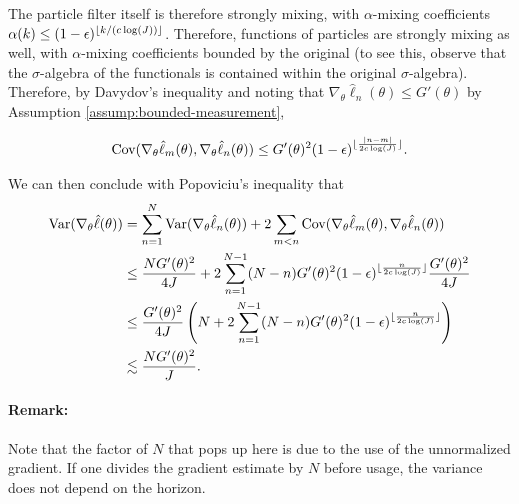 \documentclass{article}
\begin{document}
The particle filter itself is therefore strongly mixing, with $\alpha$-mixing coefficients $\alpha(k) \leq (1-\epsilon)^{\lfloor k/(c\log(J)) \rfloor}$. Therefore, functions of particles are strongly mixing as well, with $\alpha$-mixing coefficients bounded by the original (to see this, observe that the $\sigma$-algebra of the functionals is contained within the original $\sigma$-algebra). Therefore, by Davydov's inequality and noting that $\nabla_\theta\hat\ell_n(\theta)\leq G'(\theta)$ by Assumption \ref{assump:bounded-measurement}, 

$$\text{Cov}(\nabla_\theta\hat\ell_m(\theta), \nabla_\theta\hat\ell_n(\theta)) \leq G'(\theta)^2(1-\epsilon)^{\lfloor \frac{|n-m|}{2c\log(J)} \rfloor}.$$

We can then conclude with Popoviciu's inequality that 
\begin{align*}
    \text{Var}(\nabla_\theta \hat\ell(\theta)) &= \sum_{n=1}^N \text{Var}(\nabla_\theta\hat\ell_n(\theta)) + 2\sum_{m<n} \text{Cov}(\nabla_\theta\hat\ell_m(\theta),\nabla_\theta\hat\ell_n(\theta))\\
    &\leq \frac{NG'(\theta)^2}{4J} + 2\sum_{n=1}^{N-1} (N-n) G'(\theta)^2(1-\epsilon)^{\lfloor \frac{n}{2c\log(J)} \rfloor}\frac{G'(\theta)^2}{4J} \\
    &\leq \frac{G'(\theta)^2}{4J} \left(N + 2\sum_{n=1}^{N-1} (N-n) G'(\theta)^2(1-\epsilon)^{\lfloor \frac{n}{2c\log(J)} \rfloor}\right) \\
    &\lesssim \frac{NG'(\theta)^2}{J}.
\end{align*}

\paragraph{Remark:} Note that the factor of $N$ that pops up here is due to the use of the unnormalized gradient. If one divides the gradient estimate by $N$ before usage, the variance does not depend on the horizon. 



\end{document}
